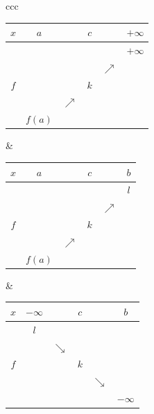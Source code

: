 \documentclass[french]{book}
\begin{document}
\begin{center}
\begin{tabular}{ccc}
 \begin{minipage}{6cm}
  \begin{tabular}{|c|ccccc|}
   \hline
  $x$ & $a$ & & $c$ & & $+\infty$ \\
   \hline
   &  & &  & & $+\infty$ \\

  & & & & $\nearrow$ &  \\

  $f$ & & & $k$ &  & \\

  & & $\nearrow$ & & & \\

  & $f(a)$ & & & & \\
\hline
  \end{tabular}
 \end{minipage}
&
 \begin{minipage}{6cm}
  \begin{tabular}{|c|ccccc|}
   \hline
  $x$ & $a$ & & $c$ & & $b$ \\
   \hline
   &  & &  &  & $l$ \\

  & & & & $\nearrow$ &   \\

  $f$ & & & $k$ &  & \\

  & & $\nearrow$ & & &  \\

  & $f(a)$ & & & &  \\
\hline
  \end{tabular}
 \end{minipage}
&
 \begin{minipage}{6cm}
  \begin{tabular}{|c|ccccc|}
   \hline
  $x$ & $-\infty$ & & $c$ & & $b$ \\
   \hline
   & $l$ & &  & &  \\

  & & $\searrow$ & & &   \\

  $f$ & & & $k$ &  &  \\

  & &  & & $\searrow$ &  \\

  & & & &   & $-\infty$  \\
\hline
  \end{tabular}
 \end{minipage}
\end{tabular}
\end{center}
\end{document}
